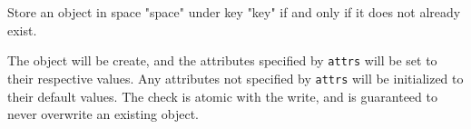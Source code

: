 Store an object in space "space" under key "key" if and only if it does not
already exist.

The object will be create, and the attributes specified by \texttt{attrs} will
be set to their respective values.  Any attributes not specified by
\texttt{attrs} will be initialized to their default values.  The check is atomic
with the write, and is guaranteed to never overwrite an existing object.




